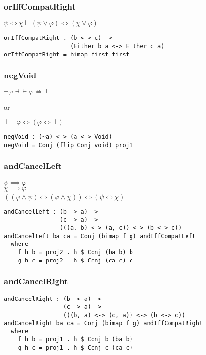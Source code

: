 \documentclass{acm_proc_article-sp}
\begin{document}
\subsubsection{orIffCompatRight}\label{oriffcompatright}

\(\psi \iff \chi \vdash (\psi \lor \varphi) \iff (\chi \lor \varphi)\)

\begin{verbatim}
orIffCompatRight : (b <-> c) ->
                   (Either b a <-> Either c a)
orIffCompatRight = bimap first first
\end{verbatim}

\subsubsection{negVoid}\label{negvoid}

\(\neg \varphi \dashv\vdash \varphi \iff \bot\)

or

\(\vdash \neg \varphi \iff (\varphi \iff \bot)\)

\begin{verbatim}
negVoid : (~a) <-> (a <-> Void)
negVoid = Conj (flip Conj void) proj1
\end{verbatim}

\subsubsection{andCancelLeft}\label{andcancelleft}

\(\psi \implies \varphi\)\\
\(\underline{\chi \implies \varphi}\)\\
\(((\varphi \land \psi) \iff (\varphi \land \chi)) \iff (\psi \iff \chi)\)

\begin{verbatim}
andCancelLeft : (b -> a) ->
                (c -> a) ->
                (((a, b) <-> (a, c)) <-> (b <-> c))
andCancelLeft ba ca = Conj (bimap f g) andIffCompatLeft
  where
    f h b = proj2 . h $ Conj (ba b) b
    g h c = proj2 . h $ Conj (ca c) c
\end{verbatim}

\newpage

\subsubsection{andCancelRight}\label{andcancelright}

\begin{verbatim}
andCancelRight : (b -> a) ->
                 (c -> a) ->
                 (((b, a) <-> (c, a)) <-> (b <-> c))
andCancelRight ba ca = Conj (bimap f g) andIffCompatRight
  where
    f h b = proj1 . h $ Conj b (ba b)
    g h c = proj1 . h $ Conj c (ca c)
\end{verbatim}
\end{document}
